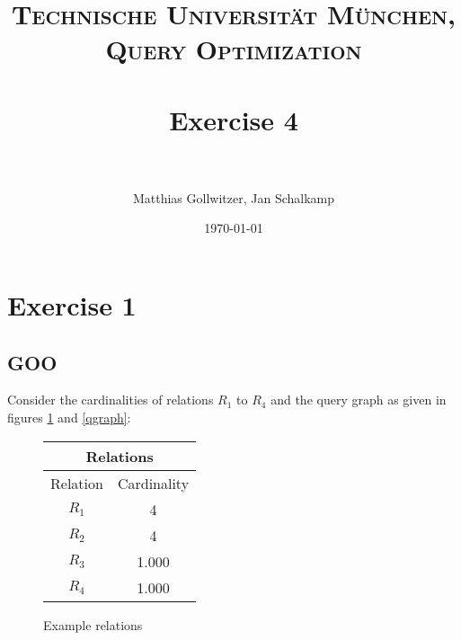 \documentclass[paper=a4, fontsize=11pt]{scrartcl} %
\title{	
\normalfont \normalsize 
\textsc{Technische Universit\"at M\"unchen, Query Optimization} \\ [25pt] %
\horrule{0.5pt} \\[0.4cm] %
\huge Exercise 4 \\ %
\horrule{2pt} \\[0.5cm] %
}
\author{Matthias Gollwitzer, Jan Schalkamp} %
\date{\normalsize\today} %
\numberwithin{equation}{section} %
\numberwithin{figure}{section} %
\numberwithin{table}{section} %
\begin{document}
\lstset{language=SQL}
\maketitle %


\section{Exercise 1}
\subsection{GOO}
Consider the cardinalities of relations $R_1$ to $R_4$ and the query graph as given in figures  \ref{relations} and \ref{qgraph}:
\begin{figure}[H]
\centering
  \begin{tabular}{ | c | c | }
  	\hline
   	\multicolumn{2}{|c|}{Relations} \\ 
	\hline
	Relation & Cardinality \\ \hline \hline
    	$R_1$ & 4 \\ \hline 
    	$R_2$ & 4 \\ \hline
	$R_3$ & 1.000 \\ \hline
	$R_4$ & 1.000 \\ \hline
  \end{tabular}
  \caption{Example relations}
  \label{relations}
 \end{figure}
\end{document}
